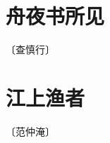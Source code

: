 \documentclass[12pt,UTF-8,openany]{ctexbook}
\begin{document}
\vspace{8pt}


\section{舟夜书所见}

\begin{center}
    \vspace{10pt}
    
    \begin{normalsize}
        
        〔查慎行〕
        
    \end{normalsize}
    
    \vspace{8pt}
    
    \begin{large}
        
        
        
    \end{large}
    
\end{center}

\vspace{8pt}


\section{江上渔者}

\begin{center}
    \vspace{10pt}
    
    \begin{normalsize}
        
        〔范仲淹〕
        
    \end{normalsize}
    
    \vspace{8pt}
    
    \begin{large}
        
        
        
    \end{large}
    
\end{center}
\end{document}
